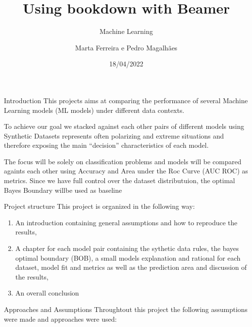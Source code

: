 \documentclass[
  ignorenonframetext,
]{article}
\title{Using bookdown with Beamer}
\subtitle{Machine Learning}
\author{Marta Ferreira e Pedro Magalhães}
\date{18/04/2022}
\begin{document}
\NoBgThispage %

\frame{\titlepage}



\begin{frame}
  \tableofcontents[hideallsubsections]
\end{frame}
\begin{frame}

\end{frame}

\begin{frame}[fragile]{Introduction}
\protect\hypertarget{introduction}{}
This projects aims at comparing the performance of several Machine Learning models (ML models) under different data contexts.

To achieve our goal we stacked against each other pairs of different models using Synthetic Datasets represents often polarizing and extreme situations and therefore exposing the main ``decision'' characteristics of each model.

The focus will be solely on classification problems and models will be compared againts each other using Accuracy and Area under the Roc Curve (AUC ROC) as metrics. Since we have full control over the dataset distributuion, the optimal Bayes Boundary willbe used as baseline

\begin{block}{Project structure}
\protect\hypertarget{project-structure}{}
This project is organized in the following way:

\begin{enumerate}
\item
  An introduction containing general assumptions and how to reproduce the results,
\item
  A chapter for each model pair containing the sythetic data rules, the bayes optimal boundary (BOB), a small models explanation and rational for each dataset, model fit and metrics as well as the prediction area and discussion of the results,
\item
  An overall conclusion
\end{enumerate}
\end{block}

\begin{block}{Approaches and Assumptions}
\protect\hypertarget{approaches-and-assumptions}{}
Throughtout this project the following assumptions were made and approaches were used:


\end{block}
\end{frame}
\end{document}
